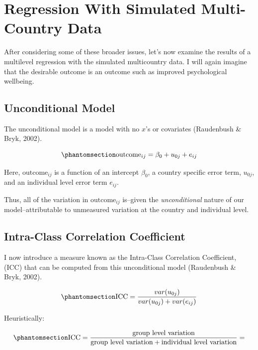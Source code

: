 \documentclass[
  letterpaper,
  DIV=11,
  numbers=noendperiod]{scrreprt}
\begin{document}
\section{Regression With Simulated Multi-Country
Data}\label{sec-regression}

After considering some of these broader issues, let's now examine the
results of a multilevel regression with the simulated multicountry data.
I will again imagine that the desirable outcome is an outcome such as
improved psychological wellbeing.

\subsection{Unconditional Model}\label{sec-unconditional}

The unconditional model is a model with no \(x\)'s or covariates
(Raudenbush \& Bryk, 2002).

\begin{equation}\phantomsection\label{eq-unconditional}{\text{outcome}_{ij} = \beta_0 + u_{0j} + e_{ij}}\end{equation}

Here, \(\text{outcome}_{ij}\) is a function of an intercept \(\beta_0\),
a country specific error term, \(u_{0j}\), and an individual level error
term \(e_{ij}\).

Thus, all of the variation in \(\text{outcome}_{ij}\) is--given the
\emph{unconditional} nature of our model--attributable to unmeasured
variation at the country and individual level.

\subsection{Intra-Class Correlation Coefficient}\label{sec-ICC}

I now introduce a measure known as the Intra-Class Correlation
Coefficient, (ICC) that can be computed from this unconditional model
(Raudenbush \& Bryk, 2002). 

\begin{equation}\phantomsection\label{eq-ICC}{\text{ICC} = \frac{var(u_{0j})}{var(u_{0j}) + var(e_{ij})}}\end{equation}

Heuristically:

\begin{equation}\phantomsection\label{eq-ICCheuristic}{\text{ICC} = \frac{\text{group level variation}}{\text{group level variation} + \text{individual level variation}} = }\end{equation}
\end{document}
